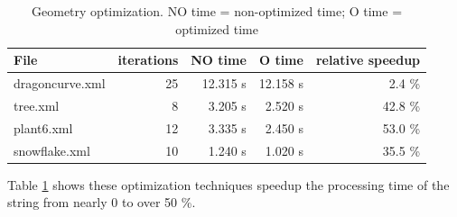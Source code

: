 \documentclass[11pt,a4paper]{article}
\begin{document}
\begin{table}
\center
\begin{tabular}{l r r r r}
File 			& iterations	& NO time	& O time	& relative speedup\\ \hline
dragoncurve.xml	& 25			& 12.315 s	& 12.158 s	&  2.4 \% \\ \hline
tree.xml		& 8				&  3.205 s	&  2.520 s	& 42.8 \% \\ \hline
plant6.xml		& 12			&  3.335 s	&  2.450 s	& 53.0 \% \\ \hline
snowflake.xml	& 10			&  1.240 s	&  1.020 s	& 35.5 \% \\ \hline

\end{tabular}
\caption{Geometry optimization. NO time = non-optimized time; O time = optimized time} \label{benchopt}
\end{table}

Table \ref{benchopt} shows these optimization techniques speedup the processing time of the string from nearly 0 to over 50 \%.


\newpage
\begin{appendix}
\listoffigures
\end{appendix}
\end{document}

